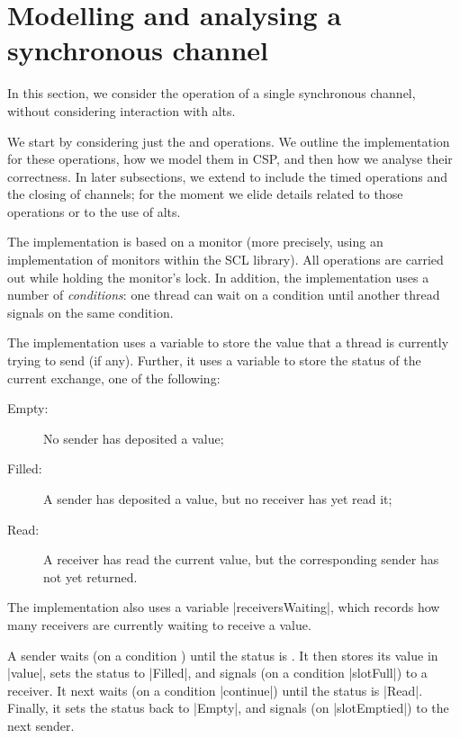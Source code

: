 \section{Modelling and analysing a  synchronous channel}
\label{sec:syncchan}

\inlineScala

In this section, we consider the operation of a single synchronous channel,
without considering interaction with alts.

We start by considering just the  and  operations.
We outline the implementation for these operations, how we model them in CSP,
and then how we analyse their correctness.  In later subsections, we extend to
include the timed operations and the closing of channels; for the moment we
elide details related to those operations or to the use of alts.

The implementation is based on a monitor (more precisely, using an
implementation of monitors within the SCL library).  All operations are
carried out while holding the monitor's lock.  In addition, the implementation
uses a number of \emph{conditions}: one thread can wait on a condition until
another thread signals on the same condition.

The implementation uses a variable  to store the value that a
thread is currently trying to send (if any).  Further, it uses a variable
 to store the status of the current exchange, one of the
following: 
\begin{description}
\item[{\scalashape Empty}:] No sender has deposited a value;
\item[{\scalashape Filled}:] A sender has deposited a value, but no receiver
  has yet read it;
\item[{\scalashape Read}:] A receiver has read the current value, but the
  corresponding sender has not yet returned.
\end{description}

The implementation also uses a variable |receiversWaiting|, which records how
many receivers are currently waiting to receive a value. 

A sender waits (on a condition ) until the status is
.  It then stores its value in |value|, sets the status to
|Filled|, and signals (on a condition |slotFull|) to a receiver.  It next 
waits (on a condition |continue|) until the status is |Read|.  Finally, it
sets the status back to |Empty|, and signals (on |slotEmptied|) to the next
sender.


